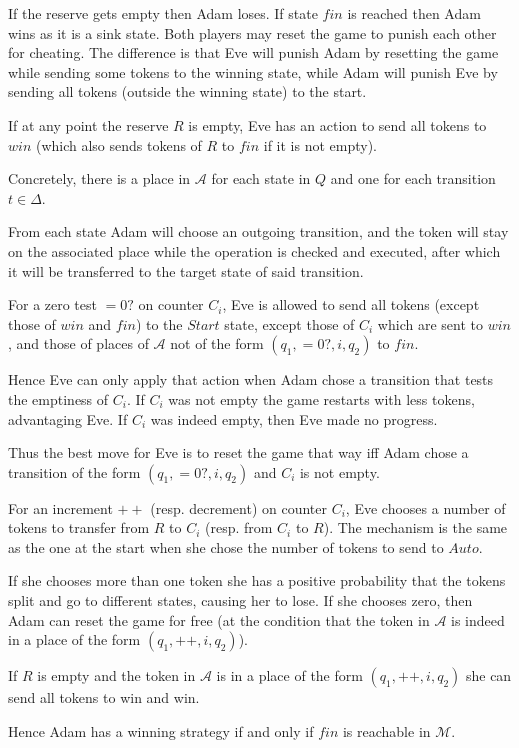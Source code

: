 \documentclass{article}
\begin{document}
If the reserve gets empty then Adam loses. If state $fin$ is reached then Adam wins as it is a sink state. Both players may reset the game to punish each other for cheating. The difference is that Eve will punish Adam by resetting the game while sending some tokens to the winning state, while Adam will punish Eve by sending all tokens (outside the winning state) to the start.

If at any point the reserve $R$ is empty, Eve has an action to send all tokens to $win$ (which also sends tokens of $R$ to $fin$ if it is not empty).

Concretely, there is a place in $\mathcal{A}$ for each state in $Q$ and one for each transition $t \in \Delta$.

From each state Adam will choose an outgoing transition, and the token will stay on the associated place while the operation is checked and executed, after which it will be transferred to the target state of said transition.

For a zero test $=0?$ on counter $C_i$, Eve is allowed to send all tokens (except those of $win$ and $fin$) to the $Start$ state, except those of $C_i$ which are sent to $win$, and those of places of $\mathcal{A}$ not of the form $(q_1, =0?, i, q_2)$ to $fin$.

Hence Eve can only apply that action when Adam chose a transition that tests the emptiness of $C_i$. If $C_i$ was not empty the game restarts with less tokens, advantaging Eve. 
If $C_i$ was indeed empty, then Eve made no progress.

Thus the best move for Eve is to reset the game that way iff Adam chose a transition of the form $(q_1, =0?, i, q_2)$ and $C_i$ is not empty. 

For an increment $++$ (resp. decrement) on counter $C_i$, Eve chooses a number of tokens to transfer from $R$ to $C_i$ (resp. from $C_i$ to $R$). The mechanism is the same as the one at the start when she chose the number of tokens to send to $Auto$.

If she chooses more than one token she has a positive probability that the tokens split and go to different states, causing her to lose. If she chooses zero, then Adam can reset the game for free (at the condition that the token in $\mathcal{A}$ is indeed in a place of the form $(q_1, ++, i, q_2)$).

If $R$ is empty and the token in $\mathcal{A}$ is in a place of the form $(q_1, ++, i, q_2)$ she can send all tokens to win and win.

Hence Adam has a winning strategy if and only if $fin$ is reachable in $\mathcal{M}$.
\end{document}
